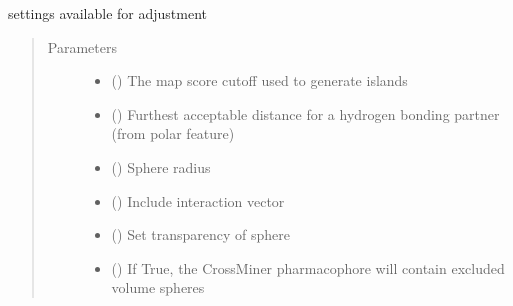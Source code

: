\documentclass[letterpaper,10pt,english]{sphinxmanual}
\begin{document}
\begin{fulllineitems}
\begin{fulllineitems}
\label{\detokenize{hs_pharmacophore_api:hotspots.hs_pharmacophore.PharmacophoreModel.Settings}}
settings available for adjustment
\begin{quote}\begin{description}
\item[{Parameters}] \leavevmode\begin{itemize}
\item {} 
 () \textendash{} The map score cutoff used to generate islands

\item {} 
 () \textendash{} Furthest acceptable distance for a hydrogen bonding partner (from polar feature)

\item {} 
 () \textendash{} Sphere radius

\item {} 
 () \textendash{} Include interaction vector

\item {} 
 () \textendash{} Set transparency of sphere

\item {} 
 () \textendash{} If True, the CrossMiner pharmacophore will contain excluded volume spheres


\end{itemize}
\end{description}
\end{quote}
\end{fulllineitems}
\end{fulllineitems}
\end{document}
